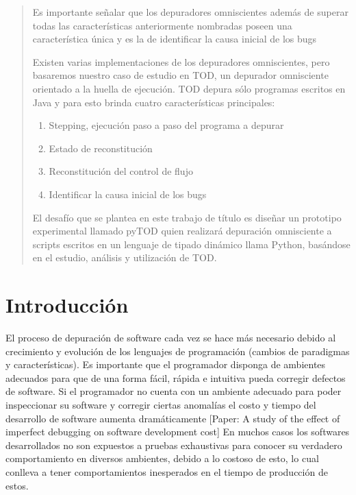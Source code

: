 \documentclass[12pt,a4paper]{report}
\begin{document}
\begin{abstract}
Es importante señalar que los depuradores omniscientes además de superar todas las características anteriormente nombradas poseen una característica única y es la de identificar la causa inicial de los bugs\footnotemark[2]

Existen varias implementaciones de los depuradores omniscientes, pero basaremos nuestro caso de estudio en TOD\footnotemark[3], un depurador omnisciente orientado a la huella de ejecución.  TOD depura sólo programas escritos en Java y para esto brinda cuatro características principales:
\begin{enumerate}
         \item Stepping, ejecución paso a paso del programa a depurar
         \item Estado de reconstitución
         \item Reconstitución del control de flujo
         \item Identificar la causa inicial de los bugs
\end{enumerate}

El desafío que se plantea en este trabajo de título es diseñar un prototipo experimental llamado pyTOD quien realizará depuración omnisciente a scripts escritos en un lenguaje de tipado dinámico llama Python, basándose en el estudio, análisis y utilización de TOD.


\end{abstract}

\newpage
\tableofcontents
\newpage
\listoffigures
\newpage
\listoftables
\newpage

\chapter{Introducción}

El proceso de depuración de software cada vez se hace más necesario debido al crecimiento y evolución de los lenguajes de programación (cambios de paradigmas y características).  Es importante que el programador disponga de ambientes adecuados para que de una forma fácil, rápida e intuitiva pueda corregir defectos de software.  Si el programador no cuenta con un ambiente adecuado para poder inspeccionar su software y corregir ciertas anomalías el costo y tiempo del desarrollo de software aumenta dramáticamente [Paper: A study of the effect of  imperfect debugging on software development cost]  En muchos casos los softwares desarrollados no son expuestos a pruebas exhaustivas para conocer su verdadero comportamiento en diversos ambientes, debido a lo costoso de esto, lo cual conlleva a tener comportamientos inesperados en el tiempo de producción de estos.
\end{document}
